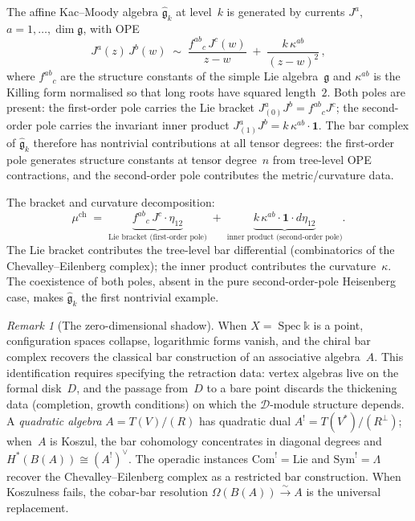 \documentclass[11pt]{report}
\theoremstyle{definition}
\theoremstyle{remark}
\newtheorem{remark}[theorem]{Remark}
\providecommand{\Bbbk}{\mathbb{k}}
\numberwithin{equation}{section}
\begin{document}
The affine Kac--Moody algebra $\widehat{\mathfrak g}_k$ at level~$k$
is generated by currents $J^a$, $a=1,\dots,\dim\mathfrak g$, with
OPE
\[
J^a(z)\,J^b(w)
\;\sim\;
\frac{f^{ab}{}_{c}\,J^c(w)}{z-w}
\;+\;
\frac{k\,\kappa^{ab}}{(z-w)^2}\,,
\]
where $f^{ab}{}_{c}$ are the structure constants of the simple Lie
algebra~$\mathfrak g$ and $\kappa^{ab}$ is the Killing form
normalised so that long roots have squared length~$2$. Both poles
are present: the first-order pole carries the Lie bracket
$J^a_{(0)}J^b=f^{ab}{}_{c}J^c$; the second-order pole carries
the invariant inner product
$J^a_{(1)}J^b=k\,\kappa^{ab}\cdot\mathbf 1$. The bar complex
of $\widehat{\mathfrak g}_k$ therefore has nontrivial contributions
at all tensor degrees: the first-order pole generates structure
constants at tensor degree~$n$ from tree-level OPE contractions,
and the second-order pole contributes the metric/curvature data.

The bracket and curvature decomposition:
\[
\mu^{\mathrm{ch}}
\;=\;
\underbrace{f^{ab}{}_{c}\,J^c\cdot\eta_{12}}_{\text{Lie bracket
(first-order pole)}}
\;+\;
\underbrace{k\,\kappa^{ab}\cdot\mathbf 1\cdot
d\eta_{12}}_{\text{inner product (second-order pole)}}.
\]
The Lie bracket contributes the tree-level bar differential
(combinatorics of the Chevalley--Eilenberg complex); the inner
product contributes the curvature~$\kappa$. The coexistence of
both poles, absent in the pure second-order-pole Heisenberg case,
makes $\widehat{\mathfrak g}_k$ the first nontrivial example.


\begin{remark}[The zero-dimensional shadow]\label{rem:preface-zero-dim}
When $X=\operatorname{Spec}\Bbbk$ is a point, configuration spaces
collapse, logarithmic forms vanish, and the chiral bar complex
recovers the classical bar construction of an associative
algebra~$A$. This identification requires specifying the
retraction data: vertex algebras live on the formal disk~$D$,
and the passage from~$D$ to a bare point discards the thickening
data (completion, growth conditions) on which the
$\mathcal{D}$-module structure depends. A \emph{quadratic algebra} $A=T(V)/(R)$ has quadratic
dual $A^!=T(V^*)/(R^\perp)$; when~$A$ is Koszul, the bar
cohomology concentrates in diagonal degrees and
$H^*(B(A))\cong(A^!)^\vee$. The operadic instances
$\mathrm{Com}^!=\mathrm{Lie}$ and $\mathrm{Sym}^!=\Lambda$ recover
the Chevalley--Eilenberg complex as a restricted bar construction.
When Koszulness fails, the cobar-bar resolution
$\Omega(B(A))\xrightarrow{\sim}A$ is the universal replacement.
\end{remark}
\end{document}
